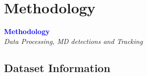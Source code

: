 \documentclass[8pt, aspectratio=169]{beamer}
\begin{document}
\section{Methodology}
\begin{frame}
    \begin{center}
        \Huge \textcolor{blue}{\textbf{Methodology}} \\
        \vspace{0.5cm}
        \large \textit{Data Processing, MD detections and Tracking}
    \end{center}
\end{frame}

\subsection{Dataset Information}
\end{document}
